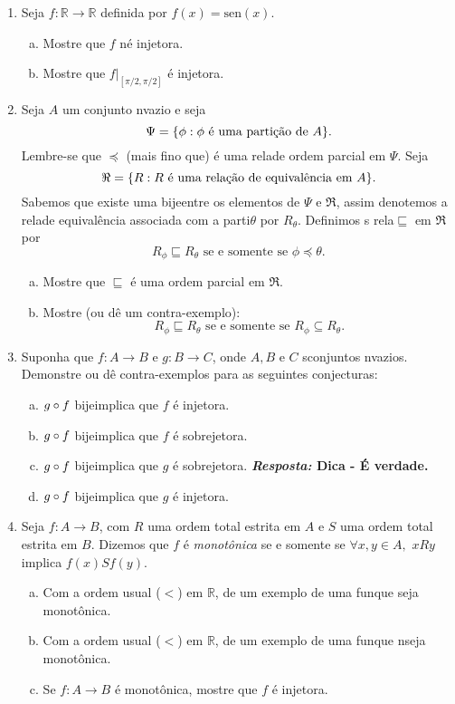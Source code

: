 \begin{enumerate}[{\bf 1.}]
\item Seja $f:\mathbb{R}\to\mathbb{R}$ definida por $f(x)=\textrm{sen}(x).$
\begin{enumerate}[a)]
\item Mostre que $f$ n\ao \'e injetora.
\item Mostre que $f|_{[\pi/2,\pi/2]}$ \'e injetora.
\end{enumerate}

\item Seja $A$ um conjunto n\ao vazio e seja 
\[
\Psi=\{\phi: \phi \textrm{ \'e uma parti\cao de } A\}.
\] 
Lembre-se que $\preceq$ (mais fino que) \'e uma rela\cao de ordem parcial em $\Psi$. Seja
\[
\Re=\{R: R \textrm{ \'e uma rela\cao de equival\^encia em } A\}.
\]
Sabemos que existe uma bije\cao entre os elementos de $\Psi$ e $\Re$, assim denotemos a rela\cao de equival\^encia associada com a parti\cao $\theta$ por $R_{\theta}$. Definimos s rela\cao $\sqsubseteq$ em $\Re$ por
\[
R_{\phi}\sqsubseteq R_{\theta} \textrm{ se e somente se } \phi \preceq \theta.
\]
\begin{enumerate}[a)]
\item Mostre que $\sqsubseteq$ \'e uma ordem parcial em $\Re$.
\item Mostre (ou d\^e um contra-exemplo):
\[
R_{\phi}\sqsubseteq R_{\theta} \textrm{ se e somente se } R_{\phi}\subseteq R_{\theta}.
\]
\end{enumerate}

\item Suponha que $f:A\to B$ e $g:B\to C$, onde $A,B$ e $C$ s\ao conjuntos n\ao vazios. Demonstre ou d\^e contra-exemplos para as seguintes conjecturas:
\begin{enumerate}[a)]
\item $g\circ f$ bije\cao implica que $f$ \'e injetora. 
\item $g\circ f$ bije\cao implica que $f$ \'e sobrejetora.
\item $g\circ f$ bije\cao implica que $g$ \'e sobrejetora. {\bf{\it Resposta:} Dica - \'E verdade.}
\item $g\circ f$ bije\cao implica que $g$ \'e injetora.
\end{enumerate}

\item Seja $f:A\to B$, com $R$ uma ordem total estrita em $A$ e $S$ uma ordem total estrita em $B$. Dizemos que $f$ \'e {\it monot\^onica} se e somente se $\forall x,y\in A,$ $xRy$ implica $f(x)Sf(y)$.
\begin{enumerate}[a)]
\item Com a ordem usual ($<$) em $\mathbb{R}$, de um exemplo de uma fun\cao que seja monot\^onica.
\item Com a ordem usual ($<$) em $\mathbb{R}$, de um exemplo de uma fun\cao que n\ao seja monot\^onica.
\item Se $f:A\to B$ \'e monot\^onica, mostre que $f$ \'e injetora.
\end{enumerate}


\end{enumerate}
